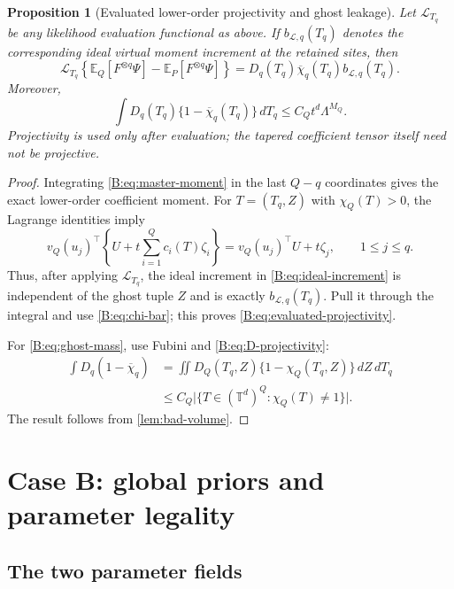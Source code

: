 \documentclass[11pt]{article}
\newtheorem{proposition}[proposition]{Proposition}
\newcommand{\E}{\mathbb{E}}
\newcommand{\Torus}{\mathbb{T}}
\newcommand{\abs}[1]{\lvert #1\rvert}
\begin{document}
\begin{proposition}[Evaluated lower-order projectivity and ghost leakage]
\label{B:prop:evaluated-projectivity}
Let \(\mathcal L_{T_q}\) be any likelihood evaluation functional as above.
If \(b_{\mathcal L,q}(T_q)\) denotes the corresponding ideal virtual moment
increment at the retained sites, then
\begin{equation}
 \mathcal L_{T_q}
 \left\{
 \E_Q[F^{\otimes q}\Psi]-\E_P[F^{\otimes q}\Psi]
 \right\}
 =D_q(T_q)\overline\chi_q(T_q)b_{\mathcal L,q}(T_q).
 \label{B:eq:evaluated-projectivity}
\end{equation}
Moreover,
\begin{equation}
 \int D_q(T_q)\{1-\overline\chi_q(T_q)\}\,dT_q
 \le C_Qt^d\Lambda^{M_Q}.
 \label{B:eq:ghost-mass}
\end{equation}
Projectivity is used only after evaluation; the tapered coefficient
tensor itself need not be projective.
\end{proposition}

\begin{proof}
Integrating \eqref{B:eq:master-moment} in the last \(Q-q\) coordinates gives
the exact lower-order coefficient moment.  For
\(T=(T_q,Z)\) with \(\chi_Q(T)>0\), the Lagrange identities imply
\[
 v_Q(u_j)^\top\left\{U+t\sum_{i=1}^Qc_i(T)\zeta_i\right\}
 =v_Q(u_j)^\top U+t\zeta_j,
 \qquad 1\le j\le q.
\]
Thus, after applying \(\mathcal L_{T_q}\), the ideal increment in
\eqref{B:eq:ideal-increment} is independent of the ghost tuple \(Z\) and is
exactly \(b_{\mathcal L,q}(T_q)\).  Pull it through the integral and use
\eqref{B:eq:chi-bar}; this proves \eqref{B:eq:evaluated-projectivity}.

For \eqref{B:eq:ghost-mass}, use Fubini and
\eqref{B:eq:D-projectivity}:
\begin{align*}
 \int D_q(1-\overline\chi_q)
 &=\iint D_Q(T_q,Z)\{1-\chi_Q(T_q,Z)\}\,dZ\,dT_q\\
 &\le C_Q\abs{\{T\in(\Torus^d)^Q:\chi_Q(T)\ne1\}}.
\end{align*}
The result follows from \cref{lem:bad-volume}.
\end{proof}

\section{Case B: global priors and parameter legality}

\subsection{The two parameter fields}
\end{document}
